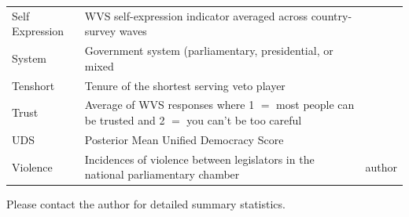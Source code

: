 \documentclass[a4paper]{article}\usepackage[]{graphicx}\usepackage[]{color}
\begin{document}
\begin{table}[!h]
\begin{center}
\begin{tabular}{l m{7cm} m{3.5cm}}
            Self Expression & WVS self-expression indicator averaged across country-survey waves & \cite{WVS2009} \\
            System & Government system (parliamentary, presidential, or mixed & \cite{DPI2001} \\
            Tenshort & Tenure of the shortest serving veto player & \cite{DPI2001} \\
            Trust & Average of WVS responses where 1 $=$ most people can be trusted and 2 $=$ you can't be too careful & \cite{WVS2009} \\
            UDS & Posterior Mean Unified Democracy Score & \cite{Pemstein2010} \\
            Violence & Incidences of violence between legislators in the national parliamentary chamber & author \\
            \hline

    \end{tabular}
    \end{center}
    \begin{singlespace}
        Please contact the author for detailed summary statistics.
    \end{singlespace}
\end{table}  
\end{document}
